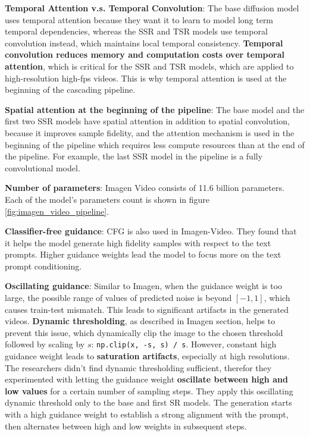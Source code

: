 \textbf{Temporal Attention v.s. Temporal Convolution}: The base diffusion model uses temporal attention because they want it to learn to model long term temporal dependencies, whereas the SSR and TSR models use temporal convolution instead, which maintains local temporal consistency. \textbf{Temporal convolution reduces memory and computation costs over temporal attention}, which is critical for the SSR and TSR models, which are applied to high-resolution high-fps videos. This is why temporal attention is used at the beginning of the cascading pipeline.

\textbf{Spatial attention at the beginning of the pipeline}: The base model and the first two SSR models have spatial attention in addition to spatial convolution, because it improves sample fidelity, and the attention mechanism is used in the beginning of the pipeline which requires less compute resources than at the end of the pipeline. For example, the last SSR model in the pipeline is a fully convolutional model.

\textbf{Number of parameters}: Imagen Video consists of 11.6 billion parameters. Each of the model's parameters count is shown in figure \ref{fig:imagen_video_pipeline}.

\textbf{Classifier-free guidance}: CFG is also used in Imagen-Video. They found that it helps the model generate high fidelity samples with respect to the text prompts. Higher guidance weights lead the model to focus more on the text prompt conditioning.

\textbf{Oscillating guidance}: Similar to Imagen, when the guidance weight is too large, the possible range of values of predicted noise is beyond $[-1, 1]$, which causes train-test mismatch. This leads to significant artifacts in the generated videos. \textbf{Dynamic thresholding}, as described in Imagen section, helps to prevent this issue, which dynamically clip the image to the chosen threshold followed by scaling by $s$: \texttt{np.clip(x, -s, s) / s}. However, constant high guidance weight leads to \textbf{saturation artifacts}, especially at high resolutions. The researchers didn't find dynamic thresholding sufficient, therefor they experimented with letting the guidance weight \textbf{oscillate between high and low values} for a certain number of sampling steps. They apply this oscillating dynamic threshold only to the base and first SR models. The generation starts with a high guidance weight to establish a strong alignment with the prompt, then alternates between high and low weights in subsequent steps.













